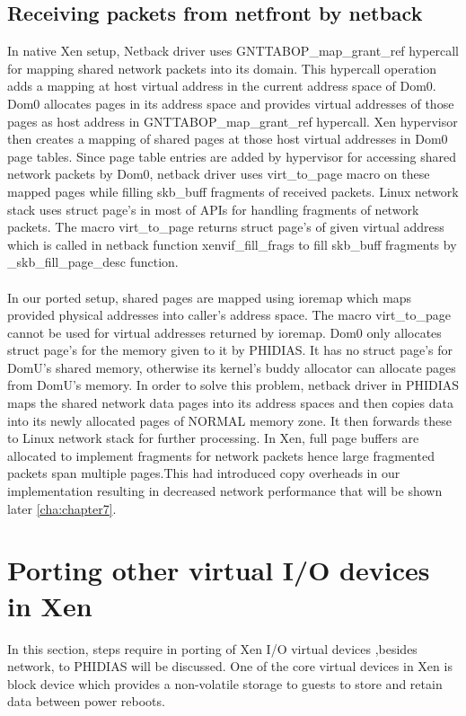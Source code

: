 \subsection{Receiving packets from netfront by netback \label{sec:rxnetfront}}
In native Xen setup, Netback driver uses GNTTABOP\_map\_grant\_ref hypercall for mapping shared network packets into its domain. This hypercall operation adds a mapping at host virtual address in the current address space of Dom0. Dom0 allocates pages in its address space and provides virtual addresses of those pages as host address in  GNTTABOP\_map\_grant\_ref hypercall. Xen hypervisor then creates a mapping of shared pages at those host virtual addresses in Dom0 page tables. Since page table entries are added by hypervisor for accessing shared network packets by Dom0, netback driver uses virt\_to\_page macro on these mapped pages while filling skb\_buff fragments of received packets. Linux network stack uses struct page's in most of APIs for handling fragments of network packets. The macro virt\_to\_page returns struct page's of given virtual address which is called in netback function xenvif\_fill\_frags to fill skb\_buff fragments by \_skb\_fill\_page\_desc function.
\\
\\
In our ported setup, shared pages are mapped using ioremap which maps provided physical addresses into caller's address space. The macro virt\_to\_page cannot be used for virtual addresses returned by ioremap. Dom0 only allocates struct page's for the memory given to it by PHIDIAS. It has no struct page's for DomU's shared memory, otherwise its kernel's buddy allocator  \cite{buddy} can allocate pages from DomU's memory. In order to solve this problem, netback driver in PHIDIAS maps the shared network data pages into its address spaces and then copies data into its newly allocated pages of NORMAL memory zone. It then forwards these to Linux network stack for further processing. In Xen, full page buffers are allocated to implement fragments for network packets hence large fragmented packets span multiple pages.This had introduced copy overheads in our implementation resulting in decreased network performance that will be shown later \ref{cha:chapter7}.

\section{Porting other virtual I/O devices in Xen \label{sec:otherio}}
In this section, steps require in porting of Xen I/O virtual devices ,besides network, to PHIDIAS will be discussed.  One of the core virtual devices in Xen is block device which provides a non-volatile storage to guests to store and retain data between power reboots.

